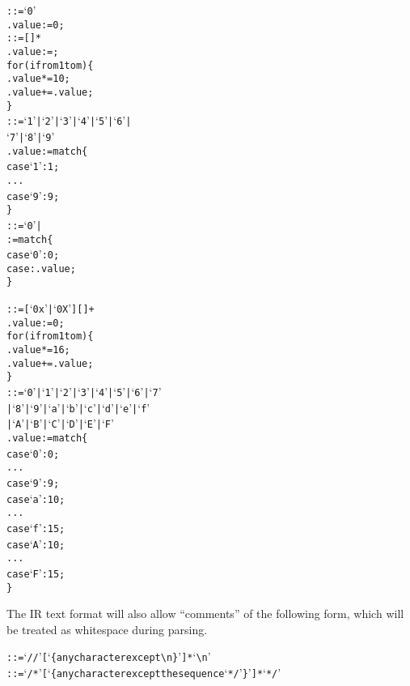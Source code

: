\begin{appendices}
\begin{alltt}
   ::= `0'\ttSem
    .value := 0;\ttSyn
   ::=  [  ]*\ttSem
    .value := ;
    for(i from 1 to m) \{
      .value *= 10;
      .value += .value;
    \}\ttSyn
   ::= `1' | `2' | `3' | `4' | `5' | `6' |
                             `7' | `8' | `9'\ttSem
    .value := match \{
      case `1': 1;
      ...
      case `9': 9;
    \}\ttSyn
   ::= `0' | \ttSem
     := match \{
      case `0': 0;
      case : .value;
    \}\ttSyn

   ::= [ `0x' | `0X' ] [  ]+\ttSem
    .value := 0;
    for(i from 1 to m) \{
      .value *= 16;
      .value += .value;
    \}\ttSyn
   ::= `0' | `1' | `2' | `3' | `4' | `5' | `6' | `7'
                | `8' | `9' | `a' | `b' | `c' | `d' | `e' | `f'
                | `A' | `B' | `C' | `D' | `E' | `F'\ttSem
    .value := match \{
      case `0': 0;
      ...
      case `9': 9;
      case `a': 10;
      ...
      case `f': 15;
      case `A': 10;
      ...
      case `F': 15;
    \}\ttSyn
\end{alltt}

The IR text format will also allow ``comments'' of the following form, which will be treated as whitespace during parsing.

\begin{alltt}\ttSyn
   ::= `//' [ `\{any character except {\textbackslash}n\}' ]* `{\textbackslash}n'
   ::= `/*' [ `\{any character except the sequence `*/'\}' ]* `*/'
\end{alltt}

\end{appendices}